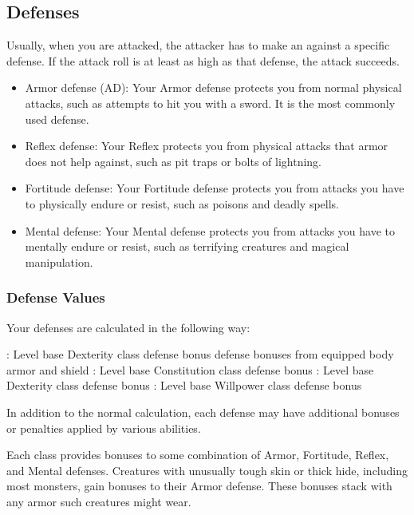     \subsection{Defenses}\label{Defenses}
        Usually, when you are attacked, the attacker has to make an  against a specific defense.
        If the attack roll is at least as high as that defense, the attack succeeds.
        \begin{itemize}
            \item Armor defense (AD): Your Armor defense protects you from normal physical attacks, such as attempts to hit you with a sword.
                It is the most commonly used defense.
            \item Reflex defense: Your Reflex protects you from physical attacks that armor does not help against, such as pit traps or bolts of lightning.
            \item Fortitude defense: Your Fortitude defense protects you from attacks you have to physically endure or resist, such as poisons and deadly spells.
            \item Mental defense: Your Mental defense protects you from attacks you have to mentally endure or resist, such as terrifying creatures and magical manipulation.
        \end{itemize}

        \subsubsection{Defense Values}\label{Defense Values}

            Your defenses are calculated in the following way:
            \begin{itemize}
                : Level \add base Dexterity \add class defense bonus \add defense bonuses from equipped body armor and shield
                : Level \add base Constitution \add class defense bonus
                : Level \add base Dexterity \add class defense bonus
                : Level \add base Willpower \add class defense bonus
            \end{itemize}
            In addition to the normal calculation, each defense may have additional bonuses or penalties applied by various abilities.

             Each class provides bonuses to some combination of Armor, Fortitude, Reflex, and Mental defenses.
             Creatures with unusually tough skin or thick hide, including most monsters, gain bonuses to their Armor defense.
            These bonuses stack with any armor such creatures might wear.


